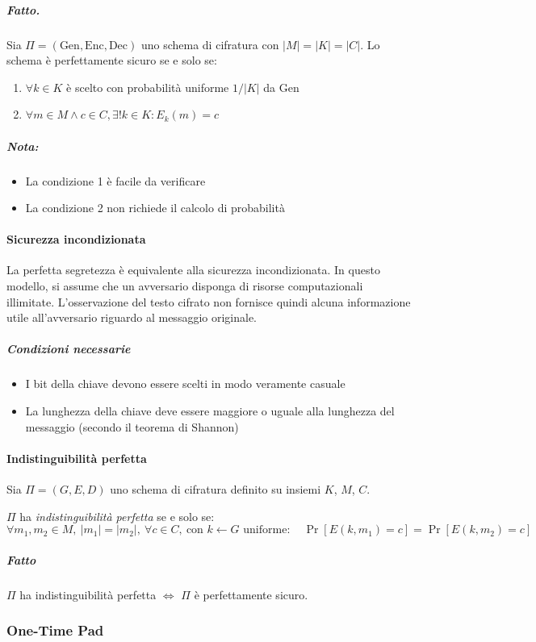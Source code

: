 \documentclass{article}
\begin{document}
  \subparagraph{Fatto.} Sia $\Pi = (\text{Gen}, \text{Enc}, \text{Dec})$ uno schema di cifratura con $|M| = |K| = |C|$. Lo schema è perfettamente sicuro se e solo se:
  \begin{enumerate}
      \item  $\forall k \in K$ è scelto con probabilità uniforme $1/|K|$ da Gen
      \item  $\forall m \in M \land c \in C, \exists! k \in K : E_k(m) = c$
  \end{enumerate}
  
  \subparagraph{Nota:}
  \begin{itemize}
      \item La condizione 1 è facile da verificare
      \item La condizione 2 non richiede il calcolo di probabilità
  \end{itemize}
  
  \paragraph{Sicurezza incondizionata}
  La perfetta segretezza è equivalente alla sicurezza incondizionata. In questo modello, si assume che un avversario disponga di risorse computazionali illimitate. L'osservazione del testo cifrato non fornisce quindi alcuna informazione utile all'avversario riguardo al messaggio originale.
  
  \subparagraph{Condizioni necessarie}
  \begin{itemize}
      \item I bit della chiave devono essere scelti in modo veramente casuale
      \item La lunghezza della chiave deve essere maggiore o uguale alla lunghezza del messaggio (secondo il teorema di Shannon)
  \end{itemize}
  
  \paragraph{Indistinguibilità perfetta}
  Sia $\Pi = (G, E, D)$ uno schema di cifratura definito su insiemi $K$, $M$, $C$.
  
  $\Pi$ ha \emph{indistinguibilità perfetta} se e solo se:
  \[
  \forall m_1, m_2 \in M,\ |m_1| = |m_2|,\ \forall c \in C,\ \text{con } k \leftarrow G \text{ uniforme}:
  \quad \Pr[E(k, m_1) = c] = \Pr[E(k, m_2) = c]
  \]
  
  \subparagraph{Fatto}
  $\Pi$ ha indistinguibilità perfetta $\iff$ $\Pi$ è perfettamente sicuro.
  
            
    \subsubsection{One-Time Pad}
       
        
  
\end{document}
